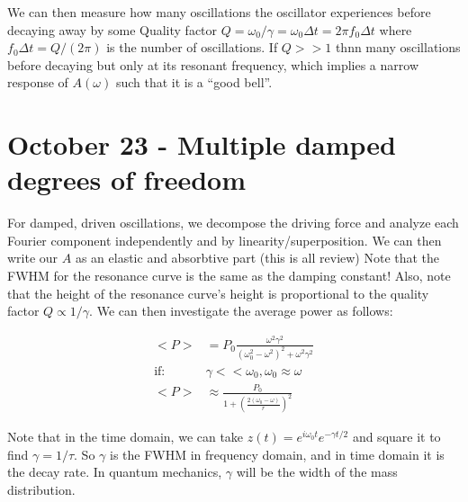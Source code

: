 \documentclass{report}
\begin{document}
We can then measure how many oscillations the oscillator experiences before decaying away by some Quality factor $Q = \omega_0/\gamma = \omega_0\Delta t = 2\pi f_0 \Delta t$ where $f_0 \Delta t = Q/(2\pi)$ is the number of oscillations. If $Q >> 1$ thnn many oscillations before decaying but only at its resonant frequency, which implies a narrow response of $A(\omega)$ such that it is a ``good bell''. 

\chapter{October 23 - Multiple damped degrees of freedom}

For damped, driven oscillations, we decompose the driving force and analyze each Fourier component independently and by linearity/superposition. We can then write our $A$ as an elastic and absorbtive part (this is all review) Note that the FWHM for the resonance curve is the same as the damping constant! Also, note that the height of the resonance curve's height is proportional to the quality factor $Q \propto 1/\gamma$. We can then investigate the average power as follows:

\begin{align*}
<P> &= P_0 \frac{\omega^2\gamma^2}{(\omega_0^2 - \omega^2)^2 + \omega^2\gamma^2}\\
\mbox{if: } &\gamma << \omega_0, \omega_0 \approx \omega\\
<P> &\approx \frac{P_0}{1+\left(\frac{2(\omega_0 - \omega)}{r}\right)^2}
\end{align*}

Note that in the time domain, we can take $z(t) = e^{i\omega_0t}e^{-\gamma t/2}$ and square it to find $\gamma = 1/\tau$. So $\gamma$ is the FWHM in frequency domain, and in time domain it is the decay rate. In quantum mechanics, $\gamma$ will be the width of the mass distribution. 
\end{document}
